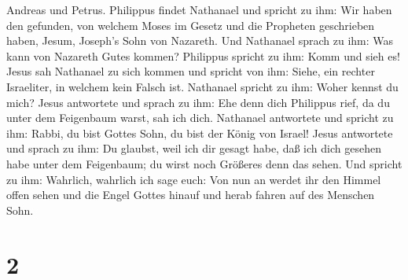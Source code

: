 Andreas und Petrus.  Philippus findet Nathanael und spricht
zu ihm: Wir haben den gefunden, von welchem Moses im Gesetz und die
Propheten geschrieben haben, Jesum, Joseph's Sohn von Nazareth.
 Und Nathanael sprach zu ihm: Was kann von Nazareth Gutes
kommen? Philippus spricht zu ihm: Komm und sieh es!  Jesus
sah Nathanael zu sich kommen und spricht von ihm: Siehe, ein rechter
Israeliter, in welchem kein Falsch ist.  Nathanael spricht
zu ihm: Woher kennst du mich? Jesus antwortete und sprach zu ihm: Ehe
denn dich Philippus rief, da du unter dem Feigenbaum warst, sah ich
dich.  Nathanael antwortete und spricht zu ihm: Rabbi, du
bist Gottes Sohn, du bist der König von Israel!  Jesus
antwortete und sprach zu ihm: Du glaubst, weil ich dir gesagt habe, daß
ich dich gesehen habe unter dem Feigenbaum; du wirst noch Größeres denn
das sehen.  Und spricht zu ihm: Wahrlich, wahrlich ich sage
euch: Von nun an werdet ihr den Himmel offen sehen und die Engel Gottes
hinauf und herab fahren auf des Menschen Sohn.

\hypertarget{section-1}{%
\section{2}\label{section-1}}

